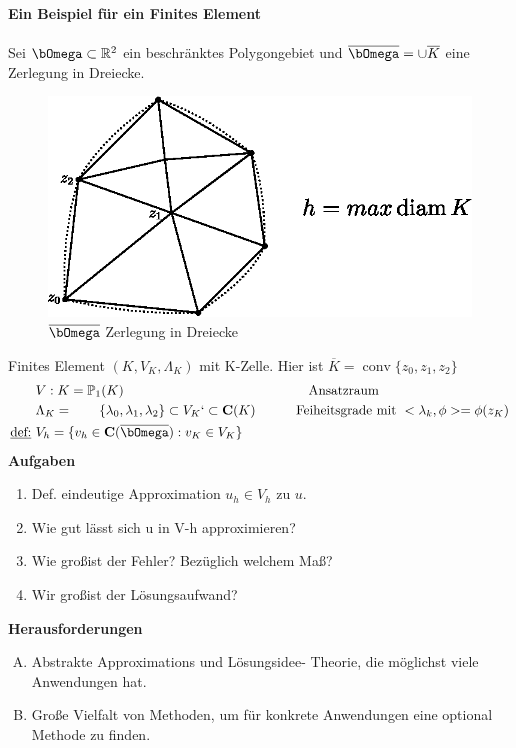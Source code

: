 \documentclass[12pt,twoside,reqno]{article}
\newcommand\conv{\operatorname*{conv}}
\renewcommand{\Omega}{\bOmega}
\newcommand\bC{\mathbf{C}}
\newcommand{\R}{\mathbb{R}}
\renewcommand{\P}{\mathbb{P}}
\theoremstyle{TheoWieners}
\theoremstyle{break}
\theoremstyle{app}
\newtheorem{Spezielle Lösungen}[app]{Spezielle Lösungen}
\newtheorem{Spezielle Lösungen der Poisson-Gleichung}[app]{Spezielle Lösungen der Poisson-Gleichung}
\newtheorem{Kartesische Gitter in 2-d}[app]{Kartesische Gitter in 2-d}
\newtheorem{Diskretisierungen hoher Ordnung}[app]{Diskretisierungen hoher Ordnung}
\newtheorem{Zyklische Reduktion}[app]{Zyklische Reduktion}
\begin{document}
\textbf{Ein Beispiel für ein Finites Element} \\ \\
Sei $\Omega \subset \R^2$ ein beschränktes Polygongebiet und $\overline\Omega = \cup \overline{K}$ eine Zerlegung in Dreiecke. 
  \begin{figure}[H]
\centering
\includegraphics[scale=.7]{grafik/Zeichnung.eps}
\caption{ $\overline\Omega$ Zerlegung in Dreiecke}
\label{Zerlegung in Dreiecke}
\end{figure}
Finites Element $(K,V_K,\Lambda_K)$ mit K-Zelle. Hier ist $\overline{K}= \conv\{ z_0, z_1, z_2\}$
 \begin{align*}
        &V:K = \P_1(K)   && \qquad \qquad \text{Ansatzraum} \\
        &\Lambda_K=\span\{ \lambda_0, \lambda_1, \lambda_2\} \subset V_K`\subset \bC(K) && \hspace{-2.55cm}\text{Feiheitsgrade mit}\  <\lambda_k,\phi>=\phi(z_K) \\
        \underline{\text{def:}} \ &V_h = \{ v_h \in \bC(\overline{\Omega}) : v_K \in V_K\}
            \end{align*}
            \textbf{Aufgaben}
\begin{enumerate}[1)]
  \item Def. eindeutige Approximation $u_h \in V_h$ zu $u$.
      \item Wie gut lässt sich u in V-h approximieren?
      \item Wie gro\ss ist der Fehler? Bezüglich welchem Ma\ss ?
      \item Wir gro\ss ist der Lösungsaufwand?
      \end{enumerate}

            \textbf{Herausforderungen}
\begin{enumerate}[A)]
  \item Abstrakte Approximations und Lösungsidee- Theorie, die möglichst viele Anwendungen hat.
      \item Gro\ss e Vielfalt von Methoden, um für konkrete Anwendungen eine optional Methode zu finden.
          \end{enumerate}
          \newpage
          
\end{document}
